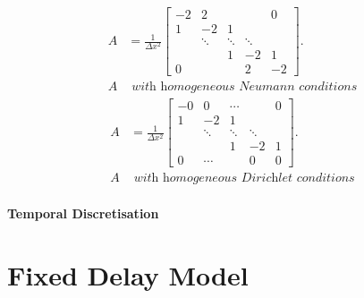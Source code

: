 \documentclass[12pt]{report}
\begin{document}
\begin{multicols}{2}
\begin{equation}\label{Aneumann}
    \begin{split}
A&=\frac{1}{\Delta x^2}\begin{bmatrix}
   -2&  2&  &  & 0\\
   1&  -2&  1&  & \\
   &  \ddots&  \ddots&  \ddots& \\
   &  &  1&  -2& 1\\
   0&  &  &  2& -2
  \end{bmatrix}.\\
  A &\textit{ with homogeneous Neumann conditions}
    \end{split}
\end{equation}
\break
\begin{equation}\label{Adirichlet}
    \begin{split}
A&=\frac{1}{\Delta x^2}\begin{bmatrix}
   -0&  0& \cdots &  & 0\\
   1&  -2&  1&  & \\
   &  \ddots&  \ddots&  \ddots& \\
   &  &  1&  -2& 1\\
   0&\cdots  &  &  0& 0
  \end{bmatrix}.\\
  A & \textit{ with homogeneous Dirichlet conditions}
    \end{split}
\end{equation}
\end{multicols}

\subsubsection{Temporal Discretisation}

\newpage
\chapter{Fixed Delay Model}
\end{document}
